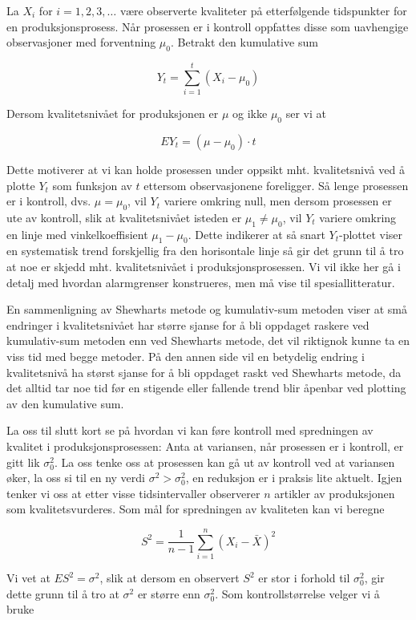 La $X_i$ for $i = 1, 2, 3, \ldots$ være observerte kvaliteter på
etterfølgende tids\-punkter for en produksjonsprosess.  Når 
prosessen er i kontroll oppfattes disse som uavhengige observasjoner
med forventning ${\mu}_0$.  Betrakt den kumulative sum

\[     Y_t=\sum_{i=1}^t(X_i-{\mu}_0)         \]

\noindent Dersom kvalitetsnivået for produksjonen er $\mu$ og ikke ${\mu}_0$
ser vi at 

\[ EY_t=(\mu-{\mu}_0)\cdot t        \]

\noindent Dette motiverer at vi kan holde prosessen under oppsikt mht. 
kvalitets\-nivå ved å plotte $Y_t$ som funksjon av $t$ ettersom 
observasjonene foreligger.  Så lenge prosessen er i kontroll, dvs.
$\mu = {\mu}_0$, vil $Y_t$ variere omkring null, men dersom prosessen
er ute av kontroll, slik at kvalitets\-nivået isteden er 
${\mu}_1 \neq {\mu}_0$, vil $Y_t$ variere omkring en linje med 
vinkelkoeffisient ${\mu}_1 - {\mu}_0$.  Dette indikerer at så snart
$Y_t$-plottet viser en systematisk trend forskjellig fra den 
horisontale linje så gir det grunn til å tro at noe er skjedd
mht. kvalitetsnivået i produksjonsprosessen.  Vi vil ikke her gå
i detalj med hvordan alarmgrenser konstrueres, men må vise til
spesiallitteratur.

En sammenligning av Shewharts metode og kumulativ-sum metoden viser
at små endringer i kvalitetsnivået har større sjanse for
å bli oppdaget raskere ved kumulativ-sum metoden enn ved Shewharts 
metode, det vil riktignok kunne ta en viss tid med begge metoder.  På
den annen side vil en betydelig endring i kvalitetsnivå ha størst
sjanse for å bli oppdaget raskt ved Shewharts metode, da det alltid 
tar noe tid før en stigende eller fallende trend blir åpenbar
ved plotting av den kumulative sum.

La oss til slutt kort se på hvordan vi kan føre kontroll med 
spredningen av kvalitet i produksjonsprosessen:  Anta at variansen,
når prosessen er i kontroll, er gitt lik ${\sigma}_0^2$.  La oss
tenke oss at prosessen kan gå ut av kontroll ved at variansen 
øker, la oss si til en ny verdi ${\sigma}^2 > {\sigma}_0^2$, en 
reduksjon er i praksis lite aktuelt.  Igjen tenker vi oss at etter visse
tidsintervaller observerer $n$ artikler av produksjonen som 
kvalitetsvurderes.  Som mål for spredningen av kvaliteten kan vi
beregne

\[  S^2=\frac{1}{n-1}\sum_{i=1}^{n}{(X_i-\bar{X})}^2 \]

\noindent Vi vet at $ES^2 = {\sigma}^2$, slik at dersom en observert $S^2$ er
stor i forhold til ${\sigma}_0^2$, gir dette grunn til å tro at
 ${\sigma}^2$ er større enn ${\sigma}_0^2$.  Som kontrollstørrelse 
velger vi å bruke

